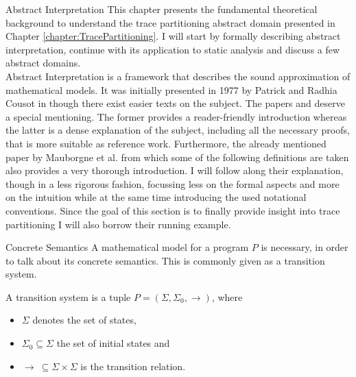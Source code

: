 %

\begin{chapter}{Abstract Interpretation}
	\label{chapter:AbstractInterpretation}
	This chapter presents the fundamental theoretical background to understand the trace partitioning abstract domain presented in Chapter \ref{chapter:TracePartitioning}. I will start by formally describing abstract interpretation, continue with its application to static analysis and discuss a few abstract domains.\\

	Abstract Interpretation is a framework that describes the sound approximation of mathematical models. It was initially presented in 1977 by Patrick and Radhia Cousot in \cite{cousot:cousot77} though there exist easier texts on the subject. The papers \cite{cousot01} and \cite{cousot:cousot04} deserve a special mentioning. The former provides a reader-friendly introduction whereas the latter is a dense explanation of the subject, including all the necessary proofs, that is more suitable as reference work. Furthermore, the already mentioned paper by Mauborgne et al. \cite{mauborgne:rival05} from which some of the following definitions are taken also provides a very thorough introduction. I will follow along their explanation, though in a less rigorous fashion, focussing less on the formal aspects and more on the intuition while at the same time introducing the used notational conventions. Since the goal of this section is to finally provide insight into trace partitioning I will also borrow their running example.

	
	\begin{section}{Concrete Semantics}
		A mathematical model for a program $P$ is necessary, in order to talk about its concrete semantics. This is commonly given as a transition system.

		\begin{definition}
			\label{definition:transitionsystem}
			A transition system is a tuple $P = (\Sigma, \Sigma_0, \to)$, where 
			\begin{itemize}
				\item $\Sigma$ denotes the set of states,
				\item $\Sigma_0 \subseteq \Sigma$ the set of initial states and
				\item $\to \ \subseteq \Sigma \times \Sigma$ is the transition relation.
			\end{itemize}
		\end{definition}


\end{section}
\end{chapter}

